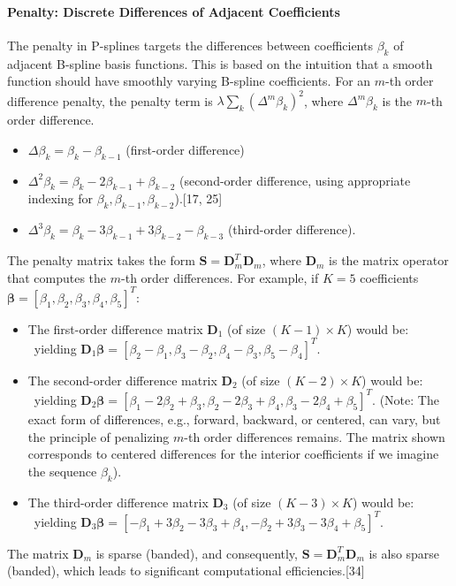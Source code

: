 \documentclass[11pt, a4paper]{article}
\begin{document}
\begin{itemize}
\paragraph{Penalty: Discrete Differences of Adjacent Coefficients}
The penalty in P-splines targets the differences between coefficients $\beta_k$ of adjacent B-spline basis functions. This is based on the intuition that a smooth function should have smoothly varying B-spline coefficients.
For an $m$-th order difference penalty, the penalty term is $\lambda \sum_{k} (\Delta^m \beta_k)^2$, where $\Delta^m \beta_k$ is the $m$-th order difference.
\begin{itemize}
 \item $\Delta \beta_k = \beta_k - \beta_{k-1}$ (first-order difference)
 \item $\Delta^2 \beta_k = \beta_k - 2\beta_{k-1} + \beta_{k-2}$ (second-order difference, using appropriate indexing for $\beta_k, \beta_{k-1}, \beta_{k-2}$).[17, 25]
 \item $\Delta^3 \beta_k = \beta_k - 3\beta_{k-1} + 3\beta_{k-2} - \beta_{k-3}$ (third-order difference).
\end{itemize}
The penalty matrix takes the form $\mathbf{S} = \mathbf{D}_m^T \mathbf{D}_m$, where $\mathbf{D}_m$ is the matrix operator that computes the $m$-th order differences.
For example, if $K=5$ coefficients $\boldsymbol{\beta} = [\beta_1, \beta_2, \beta_3, \beta_4, \beta_5]^T$:
\begin{itemize}
 \item The first-order difference matrix $\mathbf{D}_1$ (of size $(K-1) \times K$) would be:
 \
 yielding $\mathbf{D}_1 \boldsymbol{\beta} = [\beta_2-\beta_1, \beta_3-\beta_2, \beta_4-\beta_3, \beta_5-\beta_4]^T$.

 \item The second-order difference matrix $\mathbf{D}_2$ (of size $(K-2) \times K$) would be:
 \
 yielding $\mathbf{D}_2 \boldsymbol{\beta} = [\beta_1-2\beta_2+\beta_3, \beta_2-2\beta_3+\beta_4, \beta_3-2\beta_4+\beta_5]^T$. (Note: The exact form of differences, e.g., forward, backward, or centered, can vary, but the principle of penalizing $m$-th order differences remains. The matrix shown corresponds to centered differences for the interior coefficients if we imagine the sequence $\beta_k$).

 \item The third-order difference matrix $\mathbf{D}_3$ (of size $(K-3) \times K$) would be:
 \
 yielding $\mathbf{D}_3 \boldsymbol{\beta} = [-\beta_1+3\beta_2-3\beta_3+\beta_4, -\beta_2+3\beta_3-3\beta_4+\beta_5]^T$.
\end{itemize}
The matrix $\mathbf{D}_m$ is sparse (banded), and consequently, $\mathbf{S} = \mathbf{D}_m^T \mathbf{D}_m$ is also sparse (banded), which leads to significant computational efficiencies.[34]


\end{itemize}
\end{document}
